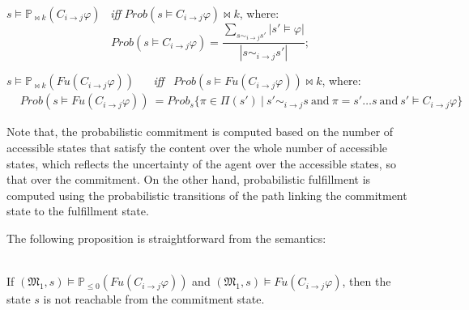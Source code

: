 \begin{definition}
\begin{itemize}
 $s\models \mathbb{P}_{\bowtie k}(C_{i\rightarrow j}\varphi)$
   ~\emph{iff}  $Prob(s \models C_{i\rightarrow j}\varphi) \bowtie \!k$, where:
%
\vspace{-0.4cm}
\begin{equation*}
Prob(s\models C_{i\rightarrow j}\varphi)=\frac{\sum_{s \sim_{i \rightarrow j}s'}|s'\models \varphi| }{|s \sim_{i \rightarrow j}s'| };
\end{equation*}

$s\models \mathbb{P}_{\bowtie k}(Fu(C_{i\rightarrow j}\varphi))$
    ~~ \emph{iff}~ $Prob(s \models Fu(C_{i\rightarrow j}\varphi)) \bowtie k$, where:
%
\begin{align*}
%
& Prob(s\models Fu(C_{i\rightarrow j}\varphi))\ = Prob_s\{\pi \in \Pi(s') ~|~ s' \sim_{i \rightarrow j}s ~\textrm{and}~ \pi = s' \ldots s ~\textrm{and}~ s' \models C_{i\rightarrow j}\varphi\}
\end{align*}

\end{itemize}

\end{definition}

Note that, the probabilistic commitment is computed based on the number of
accessible states that satisfy the content over the whole number
of accessible states, which reflects the uncertainty of the agent
over the accessible states, so that over the commitment. On the other hand, probabilistic fulfillment is computed using the probabilistic
transitions of the path linking the commitment state to the
fulfillment state.


The following proposition is straightforward from the semantics:

\begin{proposition} \label{proposition-PCTLC}~\\
If $(\mathfrak{M_1},s)\models \mathbb{P}_{\leq0} (Fu(C_{i \rightarrow
j}\varphi))$ and $(\mathfrak{M_1},s)\models Fu(C_{i \rightarrow
j}\varphi)$, then the state $s$ is not reachable from the commitment state.
\end{proposition}

